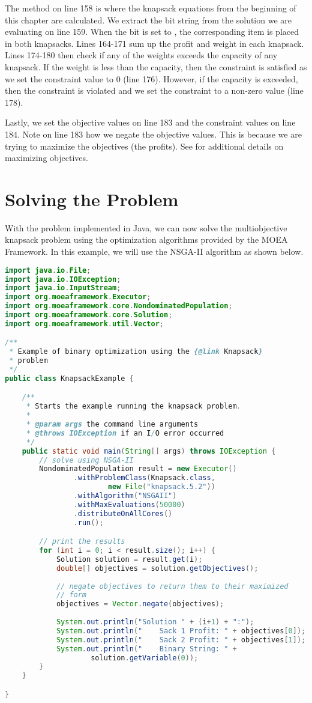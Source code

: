 The  method on line 158 is where the knapsack equations from the beginning of this chapter are calculated.  We extract the bit string from the solution we are evaluating on line 159.  When the bit is set to , the corresponding item is placed in both knapsacks.  Lines 164-171 sum up the profit and weight in each knapsack.  Lines 174-180 then check if any of the weights exceeds the capacity of any knapsack.  If the weight is less than the capacity, then the constraint is satisfied as we set the constraint value to 0 (line 176).  However, if the capacity is exceeded, then the constraint is violated and we set the constraint to a non-zero value (line 178).

Lastly, we set the objective values on line 183 and the constraint values on line 184.  Note on line 183 how we negate the objective values.  This is because we are trying to maximize the objectives (the profits).  See  for additional details on maximizing objectives.

\section{Solving the Problem}
With the problem implemented in Java, we can now solve the multiobjective knapsack problem using the optimization algorithms provided by the MOEA Framework.  In this example, we will use the NSGA-II algorithm as shown below.  

\begin{lstlisting}[language=Java]
import java.io.File;
import java.io.IOException;
import java.io.InputStream;
import org.moeaframework.Executor;
import org.moeaframework.core.NondominatedPopulation;
import org.moeaframework.core.Solution;
import org.moeaframework.util.Vector;

/**
 * Example of binary optimization using the {@link Knapsack}
 * problem
 */
public class KnapsackExample {

	/**
	 * Starts the example running the knapsack problem.
	 * 
	 * @param args the command line arguments
	 * @throws IOException if an I/O error occurred
	 */
	public static void main(String[] args) throws IOException {			
		// solve using NSGA-II
		NondominatedPopulation result = new Executor()
				.withProblemClass(Knapsack.class,
						new File("knapsack.5.2"))
				.withAlgorithm("NSGAII")
				.withMaxEvaluations(50000)
				.distributeOnAllCores()
				.run();

		// print the results
		for (int i = 0; i < result.size(); i++) {
			Solution solution = result.get(i);
			double[] objectives = solution.getObjectives();
					
			// negate objectives to return them to their maximized
			// form
			objectives = Vector.negate(objectives);
					
			System.out.println("Solution " + (i+1) + ":");
			System.out.println("    Sack 1 Profit: " + objectives[0]);
			System.out.println("    Sack 2 Profit: " + objectives[1]);
			System.out.println("    Binary String: " +
					solution.getVariable(0));
		}
	}

}
\end{lstlisting}


